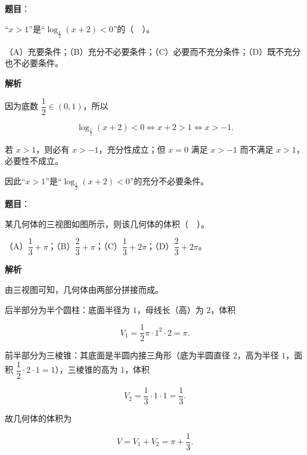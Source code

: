 \begin{answer}

\textbf{题目}：

“$x>1$”是“$\log_{\frac{1}{2}}(x+2)<0$”的（　）。

（A）充要条件；（B）充分不必要条件；（C）必要而不充分条件；（D）既不充分也不必要条件。

\textbf{解析}

因为底数 $\dfrac{1}{2}\in(0,1)$，所以

\nopagebreak[4]
\[
\log_{\frac{1}{2}}(x+2)<0\iff x+2>1\iff x>-1.
\]

若 $x>1$，则必有 $x>-1$，充分性成立；但 $x=0$ 满足 $x>-1$ 而不满足 $x>1$，必要性不成立。

因此“$x>1$”是“$\log_{\frac{1}{2}}(x+2)<0$”的充分不必要条件。


\end{answer}
\begin{answer}

\textbf{题目}：

某几何体的三视图如图所示，则该几何体的体积（　）。
\nopagebreak[4]
\begin{center}\end{center}
\nopagebreak[4]
（A）$\dfrac{1}{3}+\pi$；（B）$\dfrac{2}{3}+\pi$；（C）$\dfrac{1}{3}+2\pi$；（D）$\dfrac{2}{3}+2\pi$。

\textbf{解析}

由三视图可知，几何体由两部分拼接而成。

后半部分为半个圆柱：底面半径为 $1$，母线长（高）为 $2$，体积

\nopagebreak[4]
\[
V_{1}=\frac{1}{2}\pi\cdot 1^{2}\cdot 2=\pi.
\]

前半部分为三棱锥：其底面是半圆内接三角形（底为半圆直径 $2$，高为半径 $1$，面积 $\dfrac{1}{2}\cdot 2\cdot 1=1$），三棱锥的高为 $1$，体积

\nopagebreak[4]
\[
V_{2}=\frac{1}{3}\cdot 1\cdot 1=\frac{1}{3}.
\]

故几何体的体积为

\nopagebreak[4]
\[
V=V_{1}+V_{2}=\pi+\frac{1}{3}.
\]


\end{answer}
